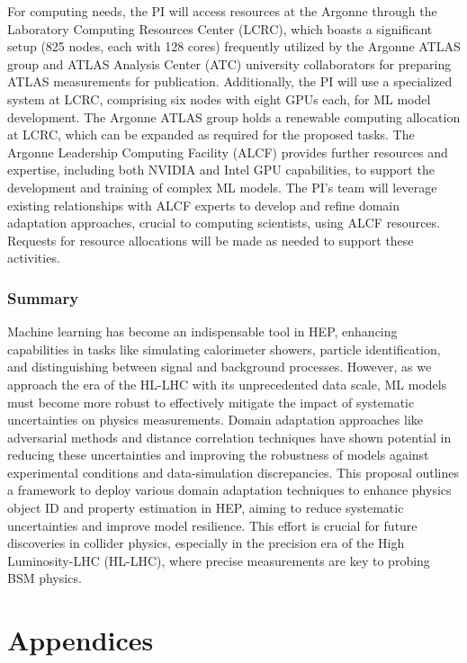 \documentclass[letter, USenglish, 11pt, subfigure]{article}
\begin{document}
For computing needs, the PI will access resources at the Argonne through the Laboratory Computing Resources Center (LCRC), which boasts a significant setup (825 nodes, each with 128 cores) frequently utilized by the Argonne ATLAS group and ATLAS Analysis Center (ATC) university collaborators for preparing ATLAS measurements for publication. Additionally, the PI will use a specialized system at LCRC, comprising six nodes with eight GPUs each, for ML model development. The Argonne ATLAS group holds a renewable computing allocation at LCRC, which can be expanded as required for the proposed tasks. The Argonne Leadership Computing Facility (ALCF) provides further resources and expertise, including both NVIDIA and Intel GPU capabilities, to support the development and training of complex ML models. The PI's team will leverage existing relationships with ALCF experts to develop and refine domain adaptation approaches, crucial to computing scientists, using ALCF resources. Requests for resource allocations will be made as needed to support these activities.

\section{Summary}
Machine learning has become an indispensable tool in HEP, enhancing capabilities in tasks like simulating calorimeter showers, particle identification, and distinguishing between signal and background processes. However, as we approach the era of the HL-LHC with its unprecedented data scale, ML models must become more robust to effectively mitigate the impact of systematic uncertainties on physics measurements.  Domain adaptation approaches like adversarial methods and distance correlation techniques have shown potential in reducing these uncertainties and improving the robustness of models against experimental conditions and data-simulation discrepancies. This proposal outlines a framework to deploy various domain adaptation techniques to enhance physics object ID and property estimation in HEP, aiming to reduce systematic uncertainties and improve model resilience. This effort is crucial for future discoveries in collider physics, especially in the precision era of the High Luminosity-LHC (HL-LHC), where precise measurements are key to probing BSM physics.

\clearpage

\appendix
\part*{Appendices}
\end{document}
